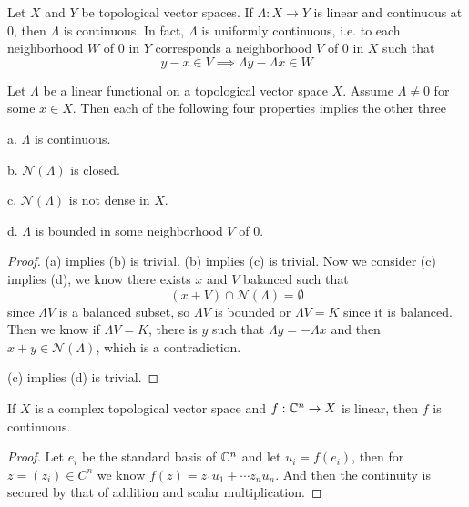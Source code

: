 \begin{theorem}
    Let $X$ and $Y$ be topological vector spaces. If $\Lambda:X\to Y$ is linear and continuous at $0$, then $\Lambda$ is continuous. In fact, $\Lambda$ is uniformly continuous, i.e. to each neighborhood $W$ of $0$ in $Y$ corresponds a neighborhood $V$ of $0$ in $X$ such that
    \[y-x \in V \implies \Lambda y - \Lambda x \in W\]
\end{theorem}

\begin{theorem}
    Let $\Lambda$ be a linear functional on a topological vector space $X$. Assume $\Lambda \neq 0$ for some $x\in X$. Then each of the following four properties implies the other three\par
    a. $\Lambda$ is continuous.\par
    b. $\mathcal{N}(\Lambda)$ is closed.\par
    c. $\mathcal{N}(\Lambda)$ is not dense in $X$.\par
    d. $\Lambda$ is bounded in some neighborhood $V$ of $0$.
\end{theorem}
\begin{proof}
    (a) implies (b) is trivial. (b) implies (c) is trivial. Now we consider (c) implies (d), we know there exists $x$ and $V$ balanced such that
    \[(x+V)\cap \mathcal{N}(\Lambda) = \emptyset\]
    since $\Lambda V$ is a balanced subset, so $\Lambda V$ is bounded or $\Lambda V = K$ since it is balanced. Then we know if $\Lambda V = K$, there is $y$ such that $\Lambda y = -\Lambda x$ and then $x+y \in \mathcal{N}(\Lambda)$, which is a contradiction.\par
    (c) implies (d) is trivial.
\end{proof}

\begin{lemma}
    If $X$ is a complex topological vector space and $f:\mathbb{C}^n \to X$ is linear, then $f$ is continuous.
\end{lemma}
\begin{proof}
    Let $e_i$ be the standard basis of $\mathbb{C}^n$ and let $u_i = f(e_i)$, then for $z= (z_i) \in C^n$ we know $f(z) = z_1u_1 + \cdots z_nu_n$. And then the continuity is secured by that of addition and scalar multiplication.
\end{proof}

